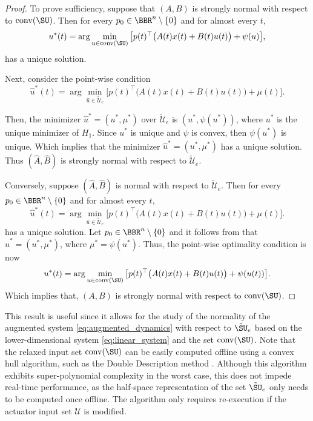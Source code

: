 \documentclass[conf]{new-aiaa}
\begin{document}
\begin{proof}
    To prove sufficiency, suppose that $(A,B)$ is strongly normal with respect to $\mathrm{conv}(\SU)$. Then for every $p_0\in\BBR^n\setminus\{0\}$ and for almost every $t$,
    \begin{equation*}
        u^*(t) = \arg \min_{u \in \mathrm{conv}(\SU)} \big[ p(t)^\top\big(A(t)x(t)+B(t)u(t)\big) + \psi(u) \big],
    \end{equation*}
    has a unique solution.
    
    Next, consider the point-wise condition
    \begin{equation*}
        \hat u^*(t) = \arg \min_{\hat u \in \tilde{\mathcal{U}}_e} \big[ p(t)^\top \big( A(t)x(t)+B(t)u(t)\big) + \mu(t) \big].
    \end{equation*}

    Then, the minimizer $\hat u^* = (u^*,\mu^*)$ over $\tilde{\mathcal{U}}_e$ is $(u^*,\psi(u^*))$, where $u^*$ is the unique minimizer of $H_1$. Since $u^*$ is unique and $\psi$ is convex, then $\psi(u^*)$ is unique. Which implies that the minimizer $\hat u^* = (u^*,\mu^*)$ has a unique solution. Thus $(\hat A,\hat B)$ is strongly normal with respect to $\tilde{\mathcal{U}}_e$.
    
    Conversely, suppose $(\hat A,\hat B)$ is normal with respect to $\tilde{\mathcal{U}}_e$. Then for every $p_0\in\BBR^n\setminus\{0\}$ and for almost every $t$,
    \begin{equation*}
        \hat u^*(t) = \arg \min_{\hat u \in \tilde{\mathcal{U}}_e} \big[ p(t)^\top \big( A(t)x(t)+B(t)u(t)\big) + \mu(t) \big].
    \end{equation*}
    has a unique solution. Let $p_0\in\BBR^n\setminus\{0\}$ and it follows from  that $\hat u^* = (u^*,\mu^*)$, where $\mu^* = \psi(u^*)$. Thus, the point-wise optimality condition is now
    \begin{equation*}
        u^*(t) = \arg \min_{u \in \mathrm{conv}(\SU)} \big[ p(t)^\top \big( A(t)x(t)+B(t)u(t)\big) + \psi(u(t)) \big].
    \end{equation*}
    Which implies that, $(A,B)$ is strongly normal with respect to $\mathrm{conv}(\SU)$.
\end{proof}

This result is useful since it allows for the study of the normality of the augmented system \cref{eq:augmented_dynamics} with respect to $\tilde{\SU}_e$ based on the lower-dimensional system \cref{eq:linear_system} and the set $\mathrm{conv}(\SU)$. Note that the relaxed input set $\mathrm{conv}(\SU)$ can be easily computed offline using a convex hull algorithm, such as the Double Description method \cite{fukuda_double_1996}. Although this algorithm exhibits super-polynomial complexity in the worst case, this does not impede real-time performance, as the half-space representation of the set $\tilde{\SU}_e$ only needs to be computed once offline. The algorithm only requires re-execution if the actuator input set $\mathcal{U}$ is modified.
\end{document}
